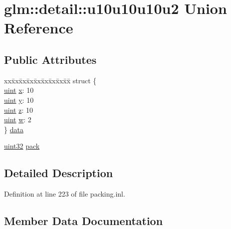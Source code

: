 \hypertarget{unionglm_1_1detail_1_1u10u10u10u2}{}\section{glm\+:\+:detail\+:\+:u10u10u10u2 Union Reference}
\label{unionglm_1_1detail_1_1u10u10u10u2}
\subsection*{Public Attributes}
\begin{DoxyCompactItemize}
\item 
\begin{tabbing}
xx\=xx\=xx\=xx\=xx\=xx\=xx\=xx\=xx\=\kill
struct \{\\
\>\hyperlink{group__core__precision_ga4fd29415871152bfb5abd588334147c8}{uint} \hyperlink{unionglm_1_1detail_1_1u10u10u10u2_ab4237d6f4aa001d47844075c42a8e16c}{x}: 10\\
\>\hyperlink{group__core__precision_ga4fd29415871152bfb5abd588334147c8}{uint} \hyperlink{unionglm_1_1detail_1_1u10u10u10u2_a7eb44cac4892d2587f8b5f67681f8e85}{y}: 10\\
\>\hyperlink{group__core__precision_ga4fd29415871152bfb5abd588334147c8}{uint} \hyperlink{unionglm_1_1detail_1_1u10u10u10u2_a8c4c851343129c55d86d6b0b7aed9b4f}{z}: 10\\
\>\hyperlink{group__core__precision_ga4fd29415871152bfb5abd588334147c8}{uint} \hyperlink{unionglm_1_1detail_1_1u10u10u10u2_a54c0903e806192c618f70c9f437d48ec}{w}: 2\\
\} \hyperlink{unionglm_1_1detail_1_1u10u10u10u2_a7ae9d8e12c6b307c06a13492a4c898aa}{data}\\

\end{tabbing}\item 
\hyperlink{namespaceglm_1_1detail_ade6cfbf377022aaa391af8cd50489222}{uint32} \hyperlink{unionglm_1_1detail_1_1u10u10u10u2_a8bb9d7804af09ba3790a4b5622321511}{pack}
\end{DoxyCompactItemize}


\subsection{Detailed Description}


Definition at line 223 of file packing.\+inl.



\subsection{Member Data Documentation}
\mbox{\label{unionglm_1_1detail_1_1u10u10u10u2_a7ae9d8e12c6b307c06a13492a4c898aa}} 
